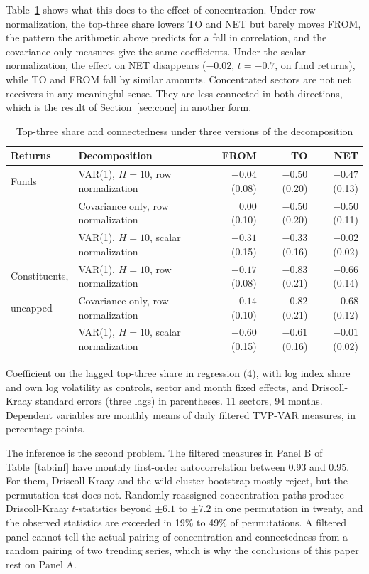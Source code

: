 \documentclass[11pt]{article}
\begin{document}
Table~\ref{tab:norm} shows what this does to the effect of concentration. Under row normalization, the top-three share lowers TO and NET but barely moves FROM, the pattern the arithmetic above predicts for a fall in correlation, and the covariance-only measures give the same coefficients. Under the scalar normalization, the effect on NET disappears ($-0.02$, $t=-0.7$, on fund returns), while TO and FROM fall by similar amounts. Concentrated sectors are not net receivers in any meaningful sense. They are less connected in both directions, which is the result of Section~\ref{sec:conc} in another form.

\begin{table}[H]
\centering
\caption{Top-three share and connectedness under three versions of the decomposition}
\label{tab:norm}
\small
\begin{tabular}{llrrr}
\toprule
Returns & Decomposition & FROM & TO & NET \\
\midrule
Funds & VAR(1), $H=10$, row normalization & $-0.04$ (0.08) & $-0.50$ (0.20) & $-0.47$ (0.13) \\
 & Covariance only, row normalization & $0.00$ (0.10) & $-0.50$ (0.20) & $-0.50$ (0.11) \\
 & VAR(1), $H=10$, scalar normalization & $-0.31$ (0.15) & $-0.33$ (0.16) & $-0.02$ (0.02) \\
\midrule
Constituents, & VAR(1), $H=10$, row normalization & $-0.17$ (0.08) & $-0.83$ (0.21) & $-0.66$ (0.14) \\
uncapped & Covariance only, row normalization & $-0.14$ (0.10) & $-0.82$ (0.21) & $-0.68$ (0.12) \\
 & VAR(1), $H=10$, scalar normalization & $-0.60$ (0.15) & $-0.61$ (0.16) & $-0.01$ (0.02) \\
\bottomrule
\end{tabular}

\smallskip
\parbox{0.95\textwidth}{\footnotesize Coefficient on the lagged top-three share in regression (4), with log index share and own log volatility as controls, sector and month fixed effects, and Driscoll-Kraay standard errors (three lags) in parentheses. 11 sectors, 94 months. Dependent variables are monthly means of daily filtered TVP-VAR measures, in percentage points.}
\end{table}

The inference is the second problem. The filtered measures in Panel B of Table~\ref{tab:inf} have monthly first-order autocorrelation between 0.93 and 0.95. For them, Driscoll-Kraay and the wild cluster bootstrap mostly reject, but the permutation test does not. Randomly reassigned concentration paths produce Driscoll-Kraay $t$-statistics beyond $\pm 6.1$ to $\pm 7.2$ in one permutation in twenty, and the observed statistics are exceeded in 19\% to 49\% of permutations. A filtered panel cannot tell the actual pairing of concentration and connectedness from a random pairing of two trending series, which is why the conclusions of this paper rest on Panel A.
\end{document}
